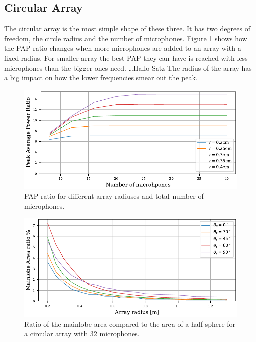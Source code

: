 \subsection{Circular Array}
The circular array is the most simple shape of these three.
It has two degrees of freedom, the circle radius and the number of microphones.
Figure \ref*{aev:fig:MicCirc} shows how the PAP ratio changes when
more microphones are added to an array with a fixed radius.
For smaller array the best PAP they can have is reached with less
microphones than the bigger ones need.
\dots Hallo Satz
The radius of the array has a big impact on how the lower frequencies
smear out the peak.


\begin{figure}
	\centering
	\includegraphics[]{images/5_array_evaluation/circ_m_pap.pdf}
	\caption{PAP ratio for different array radiuses and total number
		of microphones.}
	\label{aev:fig:MicCirc}
\end{figure}
\begin{figure}
	\centering
	\includegraphics[]{images/5_array_evaluation/area_circ.pdf}
	\caption{Ratio of the mainlobe area compared to the area of a half sphere for
		a circular array with 32 microphones.}
	\label{aev:fig:areaCirc}
\end{figure}
